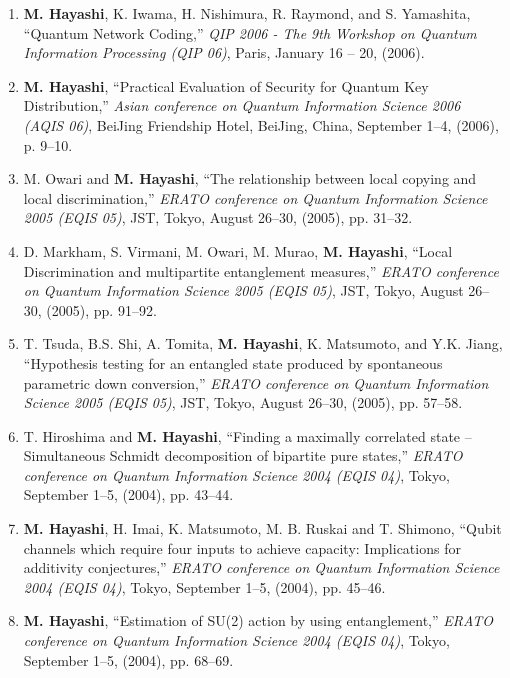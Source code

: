 \documentclass[a4paper,12pt,oneside]{article}
\begin{document}
\begin{enumerate}
\item
\textbf{M. Hayashi}, K. Iwama, H. Nishimura, R. Raymond, and S. Yamashita, ``Quantum Network Coding,'' 
{\em QIP 2006 - The 9th Workshop on Quantum Information Processing (QIP 06)}, 
Paris, January 16 -- 20, (2006).


\item
\textbf{M. Hayashi}, ``Practical Evaluation of Security for Quantum Key Distribution,'' 
{\em Asian conference on Quantum Information Science 2006 (AQIS 06)}, 
BeiJing Friendship Hotel, BeiJing, China, September 1--4, (2006), p. 9--10.


\item
M. Owari and \textbf{M. Hayashi}, ``The relationship between local copying and local discrimination,'' 
{\em ERATO conference on Quantum Information Science 2005 (EQIS 05)}, 
JST, Tokyo, August 26--30, (2005), pp. 31--32.

\item
D. Markham, S. Virmani, M. Owari, M. Murao, \textbf{M. Hayashi}, ``Local Discrimination and multipartite entanglement measures,'' 
{\em ERATO conference on Quantum Information Science 2005 (EQIS 05)}, 
JST, Tokyo, August 26--30, (2005), pp. 91--92.

\item
T. Tsuda, B.S. Shi, A. Tomita, \textbf{M. Hayashi}, K. Matsumoto, and Y.K. Jiang, ``Hypothesis testing for an entangled state produced by spontaneous parametric down conversion,'' 
{\em ERATO conference on Quantum Information Science 2005 (EQIS 05)}, 
JST, Tokyo, August 26--30, (2005), pp. 57--58.


\item
T. Hiroshima and \textbf{M. Hayashi}, ``Finding a maximally correlated state -- Simultaneous Schmidt decomposition of bipartite pure states,'' 
{\em ERATO conference on Quantum Information Science 2004 (EQIS 04)}, 
Tokyo, September 1--5, (2004), pp. 43--44.

\item
\textbf{M. Hayashi}, H. Imai, K. Matsumoto, M. B. Ruskai and T. Shimono, ``Qubit channels which require four inputs to achieve capacity: Implications for additivity conjectures,'' 
{\em ERATO conference on Quantum Information Science 2004 (EQIS 04)}, 
Tokyo, September 1--5, (2004), 
pp. 45--46.

\item
\textbf{M. Hayashi}, ``Estimation of SU(2) action by using entanglement,'' 
{\em ERATO conference on Quantum Information Science 2004 (EQIS 04)}, 
Tokyo, September 1--5, (2004), 
pp. 68--69.


\end{enumerate}
\end{document}
